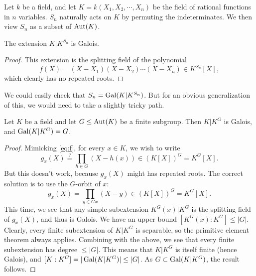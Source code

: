 \documentclass{article}
\begin{document}
\self

Let $k$ be a field, and let $K=k(X_1,X_2,\cdots,X_n)$ be the field of rational functions in $n$ variables. $S_n$ naturally acts on $K$ by permuting the indeterminates. We then view $S_n$ as a subset of $\operatorname{Aut}(K)$.

\begin{lemma}
    The extension $K\vert K^{S_n}$ is Galois.
\end{lemma}

\begin{proof}
    This extension is the splitting field of the polynomial
    \begin{equation}\label{eq:f}
        f(X) = (X-X_1)(X-X_2)\cdots(X-X_n) \in K^{S_n}[X],
    \end{equation}
    which clearly has no repeated roots.
\end{proof}

We could easily check that $S_n=\operatorname{Gal}(K\vert K^{S_n})$. But for an obvious generalization of this, we would need to take a slightly tricky path.

\begin{theorem}\label{thm.K^G}
    Let $K$ be a field and let $G\leq\operatorname{Aut}(K)$ be a finite subgroup. Then $K\vert K^G$ is Galois, and $\operatorname{Gal}(K\vert K^G)=G$.
\end{theorem}

\begin{proof}
    Mimicking \eqref{eq:f}, for every $x\in K$, we wish to write
    \begin{equation*}
        g_x(X) \overset{?}{=} \prod_{h\in G}(X-h(x)) \in (K[X])^G=K^G[X].
    \end{equation*}
    But this doesn't work, because $g_x(X)$ might has repeated roots. The correct solution is to use the $G$-orbit of $x$:
    \begin{equation*}
        g_x(X) = \prod_{y\in Gx}(X-y) \in (K[X])^G=K^G[X].
    \end{equation*}
    This time, we see that any simple subextension $K^G(x)\vert K^G$ is the splitting field of $g_x(X)$, and thus is Galois. We have an upper bound $[K^G(x):K^G] \leq \vert G\vert$. Clearly, every finite subextension of $K\vert K^G$ is separable, so the primitive element theorem always applies. Combining with the above, we see that every finite subextension has degree $\leq \vert G\vert$. This means that $K\vert K^G$ is itself finite (hence Galois), and $[K:K^G] = \vert\operatorname{Gal}(K\vert K^G)\vert \leq \vert G\vert$. As $G\subset\operatorname{Gal}(K\vert K^G)$, the result follows.
\end{proof}
\end{document}
